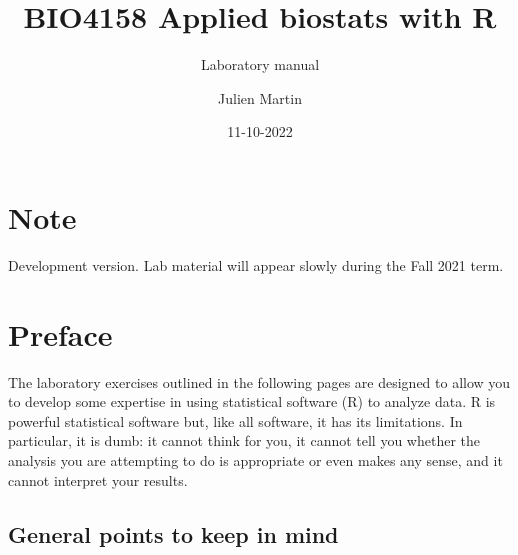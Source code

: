 \documentclass[
  12pt,
]{book}
\title{BIO4158 Applied biostats with R}
\subtitle{Laboratory manual}
\author{Julien Martin}
\date{11-10-2022}
\begin{document}
\maketitle



{
\setcounter{tocdepth}{1}
\tableofcontents
}
\hypertarget{note}{%
\chapter*{Note}\label{note}}

Development version. Lab material will appear slowly during the Fall 2021 term.

\hypertarget{preface}{%
\chapter*{Preface}\label{preface}}

The laboratory exercises outlined in the following pages are designed to allow you to develop some expertise in using statistical software (R)
to analyze data. R is powerful statistical software but, like all software, it has its limitations. In particular, it is dumb: it cannot think for you,
it cannot tell you whether the analysis you are attempting to do is appropriate or even makes any sense, and it cannot interpret your
results.

\hypertarget{general-points-to-keep-in-mind}{%
\section*{General points to keep in mind}\label{general-points-to-keep-in-mind}}
\end{document}
